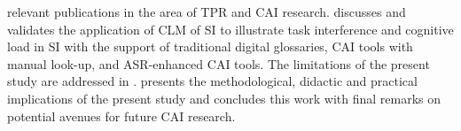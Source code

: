 relevant publications in the area of TPR and CAI research.  discusses and validates the application of \citet{seeber_thinking_2007,seeber_cognitive_2011,seeber_multimodal_2017} CLM of SI to illustrate task interference and cognitive load in SI with the support of traditional digital glossaries, CAI tools with manual look-up, and ASR-enhanced CAI tools. The limitations of the present study are addressed in .  presents the methodological, didactic and practical implications of the present study and concludes this work with final remarks on potential avenues for future CAI research.
